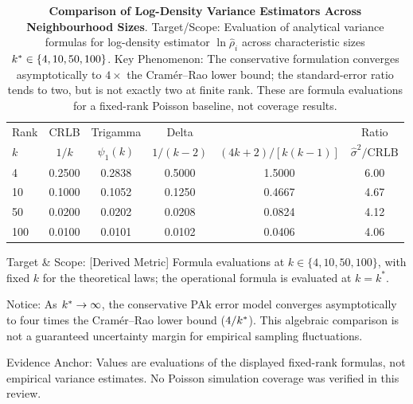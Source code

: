 \begin{table}[htbp]
  \centering
  \small
  \begin{threeparttable}
    \caption{\textbf{Comparison of Log-Density Variance Estimators
      Across Neighbourhood Sizes}. Target/Scope: Evaluation of
      analytical variance formulas for log-density
      estimator $\ln \hat{\rho}_i$ across characteristic sizes $\kstar
      \in \{4, 10, 50, 100\}$. Key Phenomenon: The conservative \pak{}
      formulation converges asymptotically to $4\times$ the
      Cram\'er--Rao lower bound; the standard-error ratio tends to two,
      but is not exactly two at finite rank. These are formula
    evaluations for a fixed-rank Poisson baseline, not coverage results.}
    \label{tab:variance_comparison}
    \begin{tabular*}{\linewidth}{@{\extracolsep{\fill}}l
        S[table-format=1.4] S[table-format=1.4] S[table-format=1.4]
      S[table-format=1.4] S[table-format=1.2]@{}}
      \toprule
      {Rank} & {CRLB} & {Trigamma} & {Delta} &
      {\pak{}} & {Ratio} \\
      {$k$} & {$1/k$} & {$\psi_1(k)$} & {$1/(k-2)$} &
      {$(4k+2)/[k(k-1)]$} & {$\hat\sigma^2/\mathrm{CRLB}$} \\
      \midrule
      \num{4}   & 0.2500 & 0.2838 & 0.5000 & 1.5000 & 6.00 \\
      \num{10}  & 0.1000 & 0.1052 & 0.1250 & 0.4667 & 4.67 \\
      \num{50}  & 0.0200 & 0.0202 & 0.0208 & 0.0824 & 4.12 \\
      \num{100} & 0.0100 & 0.0101 & 0.0102 & 0.0406 & 4.06 \\
      \bottomrule
    \end{tabular*}
    \begin{tablenotes}[flushleft]
      \footnotesize
    \item Target \& Scope: [Derived Metric] Formula evaluations at
      $k\in\{4,10,50,100\}$, with fixed $k$ for the theoretical laws;
      the operational formula is evaluated at $k=k^*$.
    \item Notice: As $k^{*} \to \infty$, the conservative PAk error
      model converges asymptotically to four times the Cram\'er--Rao
      lower bound ($4/k^{*}$). This algebraic comparison is not a
      guaranteed uncertainty margin for empirical sampling fluctuations.
    \item Evidence Anchor: Values are evaluations of the displayed
      fixed-rank formulas, not empirical variance estimates. No Poisson
      simulation coverage was verified in this review.
    \end{tablenotes}
  \end{threeparttable}
\end{table}

